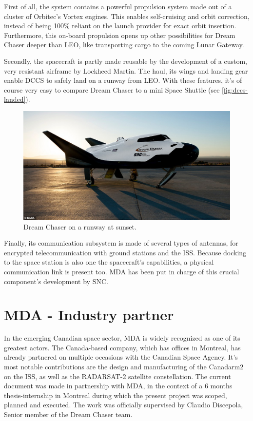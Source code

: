 First of all, the system contains a powerful propulsion system made out of a cluster of Orbitec's Vortex engines\cite{online:messier}. This enables self-cruising and orbit correction, instead of being 100\% reliant on the launch provider for exact orbit insertion. Furthermore, this on-board propulsion opens up other possibilities for Dream Chaser deeper than \gls{LEO}, like transporting cargo to the coming Lunar Gateway. 

Secondly, the  spacecraft is partly made reusable by the development of a custom, very resistant airframe by Lockheed Martin. The haul, its wings and landing gear enable \gls{DCCS} to safely land on a runway from \gls{LEO}. With these features, it's of course very easy to compare Dream Chaser to a mini Space Shuttle (see \autoref{fig:dccs-landed}). 
\begin{figure}[H]
	\centering
	\includegraphics[width=0.9\linewidth, keepaspectratio]{art/dream-chaser-landed.jpg}
	\caption{Dream Chaser on a runway at sunset.}
	\label{fig:dccs-landed}
\end{figure}
Finally, its communication subsystem is made of several types of antennas, for encrypted telecommunication with ground stations and the \gls{ISS}. Because docking to the space station is also one the spacecraft's capabilities, a physical communication link is present too. \gls{MDA} has been put in charge of this crucial component's development by \gls{SNC}. 

\section{MDA - Industry partner}
In the emerging Canadian space sector, \gls{MDA} is widely recognized as one of its greatest actors. The Canada-based company, which has offices in Montreal, has already partnered on multiple occasions with the Canadian Space Agency. It's most notable contributions are the design and manufacturing of the Canadarm2 on the \gls{ISS}, as well as the RADARSAT-2 satellite constellation. The current document was made in partnership with \gls{MDA}, in the context of a 6 months thesis-internship in Montreal during which the present project was scoped, planned and executed. The work was officially supervised by Claudio Discepola, Senior member of the Dream Chaser team. 

